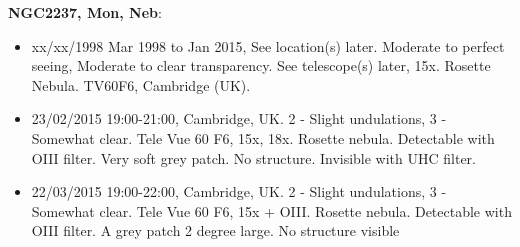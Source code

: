 {\bf NGC2237, Mon, Neb}:
\begin{itemize}
\item xx/xx/1998 Mar 1998 to Jan 2015, See location(s) later. Moderate to perfect seeing, Moderate to clear transparency. See telescope(s) later, 15x. Rosette Nebula. TV60F6, Cambridge (UK).
\item 23/02/2015 19:00-21:00, Cambridge, UK. 2 - Slight undulations, 3 - Somewhat clear. Tele Vue 60 F6, 15x, 18x. Rosette nebula. Detectable with OIII filter. Very soft grey patch. No structure. Invisible with UHC filter.
\item 22/03/2015 19:00-22:00, Cambridge, UK. 2 - Slight undulations, 3 - Somewhat clear. Tele Vue 60 F6, 15x + OIII. Rosette nebula. Detectable with OIII filter. A grey patch 2 degree large. No structure visible
\end{itemize}
